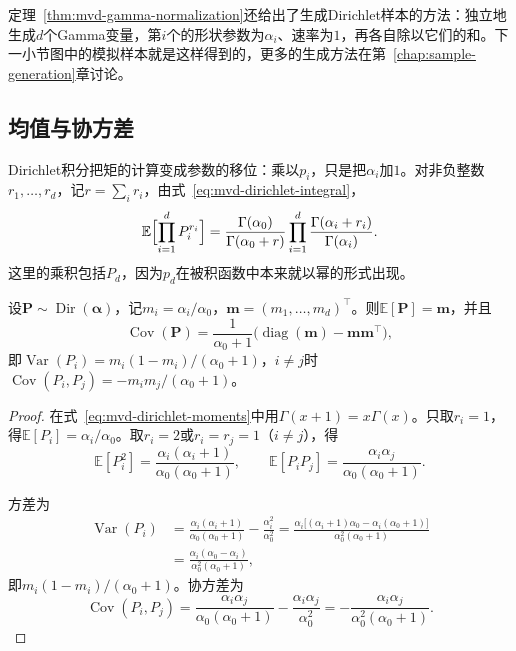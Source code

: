 定理~\ref{thm:mvd-gamma-normalization}还给出了生成Dirichlet样本的方法：独立地生成$d$个Gamma变量，第$i$个的形状参数为$\alpha_i$、速率为$1$，再各自除以它们的和。下一小节图中的模拟样本就是这样得到的，更多的生成方法在第~\ref{chap:sample-generation}章讨论。

\subsection{均值与协方差}
\label{sec:mvd-dirichlet-moments}

Dirichlet积分把矩的计算变成参数的移位：乘以$p_i$，只是把$\alpha_i$加$1$。对非负整数$r_1,\ldots,r_d$，记$r=\sum_ir_i$，由式~\eqref{eq:mvd-dirichlet-integral}，
\begin{equation}
 \mathbb{E}\Bigl[\prod_{i=1}^{d}P_i^{r_i}\Bigr]=\frac{\Gamma(\alpha_0)}{\Gamma(\alpha_0+r)}\prod_{i=1}^{d}\frac{\Gamma(\alpha_i+r_i)}{\Gamma(\alpha_i)} .
 \label{eq:mvd-dirichlet-moments}
\end{equation}
这里的乘积包括$P_d$，因为$p_d$在被积函数中本来就以幂的形式出现。

\begin{theorem}[Dirichlet的均值与协方差]
\label{thm:mvd-dirichlet-cov}
设$\bm{P}\sim\operatorname{Dir}(\bm{\alpha})$，记$m_i=\alpha_i/\alpha_0$，$\bm{m}=(m_1,\ldots,m_d)^{\top}$。则$\mathbb{E}[\bm{P}]=\bm{m}$，并且
\begin{equation}
 \operatorname{Cov}(\bm{P})=\frac{1}{\alpha_0+1}\bigl(\operatorname{diag}(\bm{m})-\bm{m}\bm{m}^{\top}\bigr) ,
 \label{eq:mvd-dirichlet-cov}
\end{equation}
即$\operatorname{Var}(P_i)=m_i(1-m_i)/(\alpha_0+1)$，$i\neq j$时$\operatorname{Cov}(P_i,P_j)=-m_im_j/(\alpha_0+1)$。
\end{theorem}

\begin{proof}
在式~\eqref{eq:mvd-dirichlet-moments}中用$\Gamma(x+1)=x\Gamma(x)$。只取$r_i=1$，得$\mathbb{E}[P_i]=\alpha_i/\alpha_0$。取$r_i=2$或$r_i=r_j=1$（$i\neq j$），得
\[
 \mathbb{E}[P_i^{2}]=\frac{\alpha_i(\alpha_i+1)}{\alpha_0(\alpha_0+1)},\qquad \mathbb{E}[P_iP_j]=\frac{\alpha_i\alpha_j}{\alpha_0(\alpha_0+1)} .
\]

方差为
\[
 \begin{aligned}
  \operatorname{Var}(P_i)&=\frac{\alpha_i(\alpha_i+1)}{\alpha_0(\alpha_0+1)}-\frac{\alpha_i^{2}}{\alpha_0^{2}}
  =\frac{\alpha_i\bigl[(\alpha_i+1)\alpha_0-\alpha_i(\alpha_0+1)\bigr]}{\alpha_0^{2}(\alpha_0+1)}\\
  &=\frac{\alpha_i(\alpha_0-\alpha_i)}{\alpha_0^{2}(\alpha_0+1)} ,
 \end{aligned}
\]
即$m_i(1-m_i)/(\alpha_0+1)$。协方差为
\[
 \operatorname{Cov}(P_i,P_j)=\frac{\alpha_i\alpha_j}{\alpha_0(\alpha_0+1)}-\frac{\alpha_i\alpha_j}{\alpha_0^{2}}=-\frac{\alpha_i\alpha_j}{\alpha_0^{2}(\alpha_0+1)} .
\]
\end{proof}

